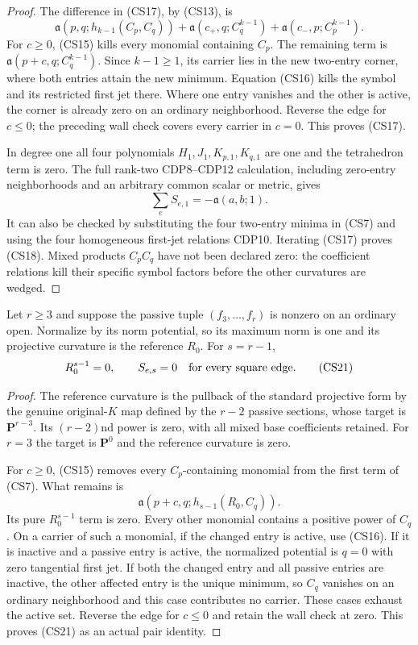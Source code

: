 \begin{proof}
The difference in (CS17), by (CS13), is
\[
 \mathfrak a(p,q;h_{k-1}(C_p,C_q))
       +\mathfrak a(c_+,q;C_q^{k-1})
       +\mathfrak a(c_-,p;C_p^{k-1}).
 \tag{CS19}
\]
For $c\ge0$, (CS15) kills every monomial containing $C_p$.
The remaining term is $\mathfrak a(p+c,q;C_q^{k-1})$.
Since $k-1\ge1$, its carrier lies in the new two-entry corner,
where both entries attain the new minimum.  Equation (CS16)
kills the symbol and its restricted first jet there.  Where one
entry vanishes and the other is active, the corner is already
zero on an ordinary neighborhood.  Reverse the edge for $c\le0$;
the preceding wall check covers every carrier in $c=0$.
This proves (CS17).

In degree one all four polynomials $H_1,J_1,K_{p,1},K_{q,1}$
are one and the tetrahedron term is zero.  The full rank-two
CDP8--CDP12 calculation, including zero-entry neighborhoods and an
arbitrary common scalar or metric, gives
\[
                          \sum_e S_{e,1}=-\mathfrak a(a,b;1).
 \tag{CS20}
\]
It can also be checked by substituting the four two-entry minima
in (CS7) and using the four homogeneous first-jet relations CDP10.
Iterating (CS17) proves (CS18).  Mixed products $C_pC_q$ have
not been declared zero: the coefficient relations kill their
specific symbol factors before the other curvatures are wedged.
\end{proof}

\begin{lemma}
Let $r\ge3$ and suppose the passive tuple $(f_3,\ldots,f_r)$
is nonzero on an ordinary open.  Normalize by its norm potential,
so its maximum norm is one and its projective curvature is the
reference $R_0$.  For $s=r-1$,
\[
                    R_0^{s-1}=0,\qquad S_{e,s}=0
                                \quad\hbox{for every square edge}.
 \tag{CS21}
\]
\end{lemma}

\begin{proof}
The reference curvature is the pullback of the standard projective
form by the genuine original-$K$ map defined by the $r-2$ passive
sections, whose target is $\mathbf P^{r-3}$.  Its $(r-2)$nd power
is zero, with all mixed base coefficients retained.  For $r=3$
the target is $\mathbf P^0$ and the reference curvature is zero.

For $c\ge0$, (CS15) removes every $C_p$-containing monomial from
the first term of (CS7).  What remains is
\[
             \mathfrak a(p+c,q;h_{s-1}(R_0,C_q)).
 \tag{CS22}
\]
Its pure $R_0^{s-1}$ term is zero.  Every other monomial contains
a positive power of $C_q$.  On a carrier of such a monomial,
if the changed entry is active, use (CS16).  If it is inactive
and a passive entry is active, the normalized potential is $q=0$
with zero tangential first jet.  If both the changed entry and
all passive entries are inactive, the other affected entry is
the unique minimum, so $C_q$ vanishes on an ordinary neighborhood
and this case contributes no carrier.  These cases exhaust the
active set.  Reverse the edge for $c\le0$ and retain the wall
check at zero.  This proves (CS21) as an actual pair identity.
\end{proof}

